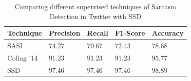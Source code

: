 \begin{table}[htb]
  \centering
  {\small
  \begin{tabular}{|@{~}l@{~~}|@{~~}l@{~}|@{~~}l@{~}|@{~~}l@{~}|@{~~}l@{~}|}
\hline
Technique & Precision & Recall & F1-Score & Accuracy\\\hline
SASI \cite{davidov10} & $74.27$ & $70.67$ & $72.43$ & $78.68$\\\hline
Coling '14 \cite{tomas14} & $91.23$ & $91.23$ & $91.23$ & $95.77$\\\hline
SSD & $97.46$ & $97.46$ & $97.46$ & $98.89$\\\hline
\end{tabular}
  }
 \vspace{0.05in}
  \caption{Comparing different supervised techniques of Sarcasm Detection in Twitter with SSD}
  \label{tab:data2}
\end{table}

